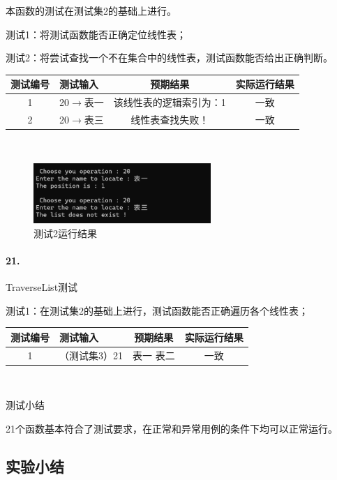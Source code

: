 \documentclass[supercite]{Experimental_Report}
\theoremstyle{definition}
\begin{document}
本函数的测试在测试集2的基础上进行。

测试1：将测试函数能否正确定位线性表；

测试2：将尝试查找一个不在集合中的线性表，测试函数能否给出正确判断。

\vspace{0.5em}

\begin{tabular}{|c|p{2.7cm}|c|c|}
	\hline
	测试编号 & 测试输入 & 预期结果 & 实际运行结果 \\
	\hline
	1 & 20$\rightarrow$表一 & 该线性表的逻辑索引为：1 & 一致 \\
	\hline
	2 & 20$\rightarrow$表三 & 线性表查找失败！ & 一致 \\
	\hline
\end{tabular}

~\

 \begin{figure}[H]
 	\centering
 	\includegraphics[width=0.6\textwidth]{images/线性表测试20.png}
 	\caption{测试2运行结果}
 	\label{txlab}
 \end{figure}


\paragraph{21.}TraverseList测试
	
测试1：在测试集2的基础上进行，测试函数能否正确遍历各个线性表；

\vspace{0.5em}

\begin{tabular}{|c|p{2.7cm}|c|c|}
	\hline
	测试编号 & 测试输入 & 预期结果 & 实际运行结果 \\
	\hline
	1 & （测试集3）21 & 表一 表二 & 一致 \\
	\hline
\end{tabular}

~\

测试小结

21个函数基本符合了测试要求，在正常和异常用例的条件下均可以正常运行。

\subsection{实验小结}
\end{document}
